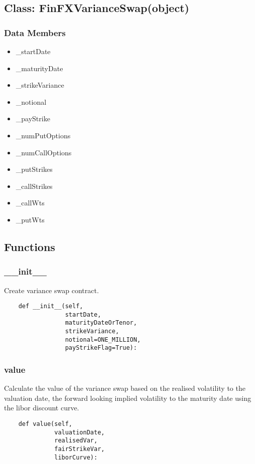 \documentclass[twoside,11pt]{book}
\begin{document}
\subsection*{Class: FinFXVarianceSwap(object)}


\subsubsection*{Data Members}
\begin{itemize}
\item{\_startDate}
\item{\_maturityDate}
\item{\_strikeVariance}
\item{\_notional}
\item{\_payStrike}
\item{\_numPutOptions}
\item{\_numCallOptions}
\item{\_putStrikes}
\item{\_callStrikes}
\item{\_callWts}
\item{\_putWts}
\end{itemize}

\subsection*{Functions}

\subsubsection*{{\bf \_\_init\_\_}}
Create variance swap contract.  

\begin{lstlisting}
    def __init__(self,
                 startDate,
                 maturityDateOrTenor,
                 strikeVariance,
                 notional=ONE_MILLION,
                 payStrikeFlag=True):
\end{lstlisting}

\subsubsection*{{\bf value}}
Calculate the value of the variance swap based on the realised volatility to the valuation date, the forward looking implied volatility to the maturity date using the libor discount curve.  

\begin{lstlisting}
    def value(self,
              valuationDate,
              realisedVar,
              fairStrikeVar,
              liborCurve):
\end{lstlisting}
\end{document}
